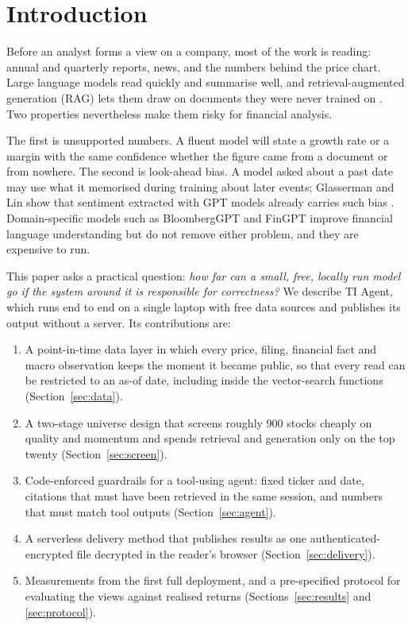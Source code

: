\documentclass[preprint,11pt]{elsarticle}
\begin{document}
\section{Introduction}
\label{sec:intro}

Before an analyst forms a view on a company, most of the work is reading: annual and quarterly reports,
news, and the numbers behind the price chart. Large language models read quickly and summarise well, and
retrieval-augmented generation (RAG) lets them draw on documents they were never trained on
\cite{lewis2020retrievalaugmented, gao2023retrievalaugmented}. Two properties nevertheless make them risky
for financial analysis.

The first is unsupported numbers. A fluent model will state a growth rate or a margin with the same
confidence whether the figure came from a document or from nowhere. The second is look-ahead bias. A model
asked about a past date may use what it memorised during training about later events; Glasserman and Lin
show that sentiment extracted with GPT models already carries such bias \cite{glasserman2023assessing}.
Domain-specific models such as BloombergGPT \cite{wu2023bloomberggpt} and FinGPT \cite{yang2023fingpt}
improve financial language understanding but do not remove either problem, and they are expensive to run.

This paper asks a practical question: \emph{how far can a small, free, locally run model go if the system
around it is responsible for correctness?} We describe TI Agent, which runs end to end on a single laptop
with free data sources and publishes its output without a server. Its contributions are:

\begin{enumerate}
  \item A point-in-time data layer in which every price, filing, financial fact and macro observation keeps
        the moment it became public, so that every read can be restricted to an as-of date, including inside
        the vector-search functions (Section~\ref{sec:data}).
  \item A two-stage universe design that screens roughly 900 stocks cheaply on quality and momentum and
        spends retrieval and generation only on the top twenty (Section~\ref{sec:screen}).
  \item Code-enforced guardrails for a tool-using agent: fixed ticker and date, citations that must have
        been retrieved in the same session, and numbers that must match tool outputs
        (Section~\ref{sec:agent}).
  \item A serverless delivery method that publishes results as one authenticated-encrypted file decrypted
        in the reader's browser (Section~\ref{sec:delivery}).
  \item Measurements from the first full deployment, and a pre-specified protocol for evaluating the
        views against realised returns (Sections~\ref{sec:results} and \ref{sec:protocol}).
\end{enumerate}
\end{document}

